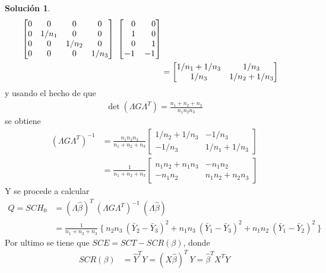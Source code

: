 \documentclass[12pt]{article}
\theoremstyle{plain}
\theoremstyle{definition}
\theoremstyle{definition}
\theoremstyle{definition}
\newtheorem*{solution}{Solución}
\begin{document}
\begin{solution}
\begin{align*}
\begin{bmatrix}
0 & 0 & 0 & 0\\
0 & 1/n_1 & 0 & 0\\
0 & 0 & 1/n_2 & 0\\
0 & 0 & 0 & 1/n_3
\end{bmatrix}  \ \begin{bmatrix}
\hspace{0.325cm}0 & \hspace{0.325cm}0 \\
\hspace{0.325cm}1 & \hspace{0.325cm}0 \\
\hspace{0.325cm}0 & \hspace{0.325cm}1 \\
-1 & -1
\end{bmatrix}\\
&=\begin{bmatrix}
1/n_1 + 1/n_3 & 1/n_3\\
1/n_3 & 1/n_2 + 1/n_3
\end{bmatrix}
\end{align*}
y usando el hecho de que 
\begin{align*}
    \det(\Lambda G \Lambda^T) = \frac{n_1+n_2+n_3}{n_1n_2n_3}
\end{align*}
se obtiene
\begin{align*}
(\Lambda G \Lambda^T)^{-1} &= \frac{n_1n_2n_3}{n_1+n_2+n_3}\begin{bmatrix}
1/n_2 + 1/n_3 & -1/n_3\\
-1/n_3 & 1/n_1 + 1/n_3
\end{bmatrix} \\
&= \frac{1}{n_1+n_2+n_3}\begin{bmatrix}
n_1n_2 + n_1n_3 & -n_1n_2\\
-n_1n_2 & n_1n_2 + n_2n_3
\end{bmatrix}
\end{align*}
Y se procede a calcular
\begin{align*}
Q = SCH_0 &= (\Lambda\hat\beta)^T\ (\Lambda G \Lambda^T)^{-1} \ (\Lambda\hat\beta)\\
&=\frac{1}{n_1+n_2+n_3} \ \Bigg\{\: n_2n_3\ (\bar{Y}_2-\bar{Y}_3)^2 + n_1n_3\
(\bar{Y}_1-\bar{Y}_3)^2 + n_1n_2\ (\bar{Y}_1-\bar{Y}_2)^2 \:\Bigg\}
\end{align*}
Por ultimo se tiene que $SCE=SCT-SCR(\beta)$, donde
\begin{align*}
SCR(\beta) &= \hat Y^T  Y = (X \hat\beta)^T\ Y =\hat{\beta}^TX^TY\\

\end{align*}
\end{solution}
\end{document}
